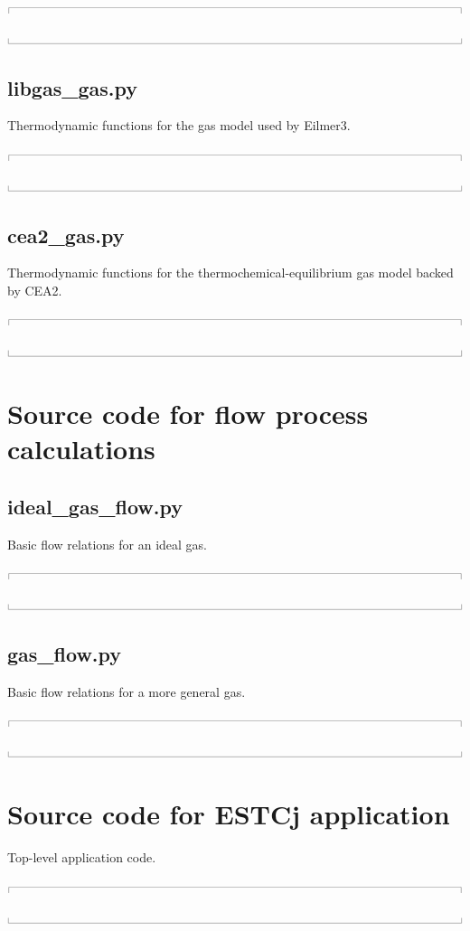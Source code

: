 \documentclass[10pt,a4paper]{article}
\newcommand{\topbar}{\ensuremath{
    \rule{0.1mm}{2.0mm} \rule[2.0mm]{159.5mm}{0.1mm} \rule{0.1mm}{2.0mm}
}}
\newcommand{\bottombar}{\ensuremath{
    \rule{0.1mm}{2.0mm} \rule{159.5mm}{0.1mm} \rule{0.1mm}{2.0mm}
}}
\begin{document}
\noindent\topbar

\bottombar

\newpage
\subsection{libgas\_gas.py}
\label{libgas-gas-py}
%
Thermodynamic functions for the gas model used by Eilmer3.

\noindent\topbar

\bottombar

\newpage
\subsection{cea2\_gas.py}
\label{cea2-gas-py}
%
Thermodynamic functions for the thermochemical-equilibrium gas model backed by CEA2.

\noindent\topbar

\bottombar

\newpage
\section{Source code for flow process calculations}
%
\subsection{ideal\_gas\_flow.py}
\label{ideal-gas-flow-py}
%
Basic flow relations for an ideal gas.

\noindent\topbar

\bottombar

\newpage
\subsection{gas\_flow.py}
\label{gas-flow-py}
%
Basic flow relations for a more general gas.

\noindent\topbar

\bottombar

\newpage
\section{Source code for ESTCj application}
\label{estcj-py}
%
Top-level application code.

\noindent\topbar

\bottombar
\end{document}

